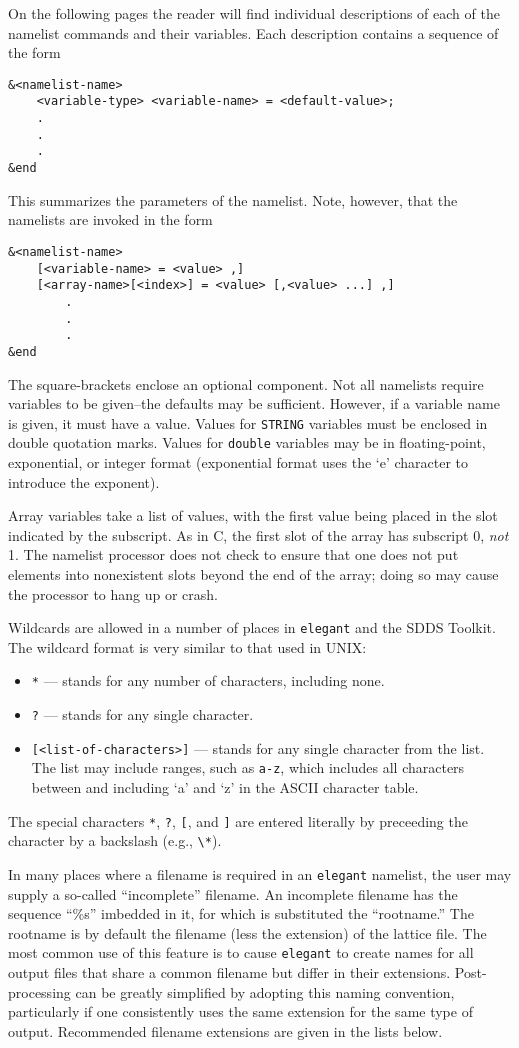 \documentclass[11pt]{article}
\begin{document}
On the following pages the reader will find individual descriptions of each of the namelist commands and their 
variables.  Each description contains a sequence of the form
\begin{verbatim}
&<namelist-name>
    <variable-type> <variable-name> = <default-value>;
    .
    .
    .
&end
\end{verbatim}
This summarizes the parameters of the namelist.  Note, however, that the namelists are invoked in the form
\begin{verbatim}
&<namelist-name>
    [<variable-name> = <value> ,]
    [<array-name>[<index>] = <value> [,<value> ...] ,]
        .
        .
        .
&end
\end{verbatim}  The square-brackets enclose an optional component.  Not all namelists require variables to 
be given--the defaults may be sufficient.  However, if a variable name
is given, it must have a value.  Values for \verb|STRING| variables
must be enclosed in double quotation marks.  Values for \verb|double|
variables may be in floating-point, exponential, or integer format
(exponential format uses the `e' character to introduce the exponent).

Array variables take a list of values, with the first value being
placed in the slot indicated by the subscript.  As in C, the first
slot of the array has subscript 0, {\em not} 1.  The namelist
processor does not check to ensure that one does not put elements into
nonexistent slots beyond the end of the array; doing so may cause the
processor to hang up or crash.

Wildcards are allowed in a number of places in {\tt elegant} and the SDDS Toolkit.  The wildcard format is
very similar to that used in UNIX:
\begin{itemize}
\item \verb|*| --- stands for any number of characters, including none.
\item \verb|?| --- stands for any single character.
\item \verb|[<list-of-characters>]| --- stands for any single character from the list.  The list may include
ranges, such as \verb|a-z|, which includes all characters between and including `a' and `z' in the ASCII
character table.
\end{itemize}
The special characters \verb|*|, \verb|?|, \verb|[|, and \verb|]| are entered literally by preceeding the character by a
backslash (e.g., \verb|\*|).

In many places where a filename is required in an {\tt elegant}
namelist, the user may supply a so-called ``incomplete'' filename.  An
incomplete filename has the sequence ``\%s'' imbedded in it, for which
is substituted the ``rootname.''  The rootname is by default the
filename (less the extension) of the lattice file.  The most common
use of this feature is to cause {\tt elegant} to create names for all
output files that share a common filename but differ in their
extensions.  Post-processing can be greatly simplified by adopting
this naming convention, particularly if one consistently uses the same
extension for the same type of output.  Recommended filename
extensions are given in the lists below.
\end{document}
